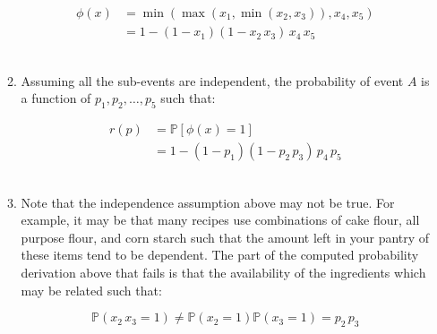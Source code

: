 \documentclass{article}
\begin{document}
\begin{enumerate}
\begin{enumerate}
        \begin{equation}
            \begin{split}
                \phi(x) &= \min(\max(x_1, \min(x_2, x_3)), x_4, x_5)\\
                &=  1-(1-x_1)(1-x_2 \, x_3) \, x_4 \, x_5
            \end{split}
        \end{equation}\\

        \item Assuming all the sub-events are independent, the probability of event $A$ is a function of $p_1, p_2,\hdots, p_5$ such that:

        \begin{equation}
            \begin{split}
                r(p) &= \mathbb{P}{[\phi(x)=1]}\\
                &= 1-(1-p_1)(1-p_2 \, p_3) \, p_4 \, p_5
            \end{split}
        \end{equation}\\

        \item Note that the independence assumption above may not be true. For example, it may be that many recipes use combinations of cake flour, all purpose flour, and corn starch such that the amount left in your pantry of these items tend to be dependent. The part of the computed probability derivation above that fails is that the availability of the ingredients which may be related such that:
        
        \begin{equation}
            \mathbb{P}{(x_2 \, x_3 = 1)} \neq \mathbb{P}{(x_2=1)} \mathbb{P}{(x_3=1)} = p_2 \, p_3 
        \end{equation}
        
    \end{enumerate}
\end{enumerate}
\end{document}

